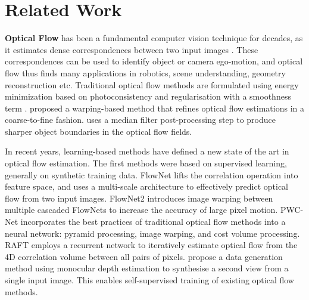 \section{Related Work}

\textbf{Optical Flow}
has been a fundamental computer vision technique for decades, as it estimates dense correspondences between two input images \cite{BakerSLRBS2011,MenzeHG2018}.
These correspondences can be used to identify object or camera ego-motion, and optical flow thus finds many applications in robotics, scene understanding, geometry reconstruction etc.
%
Traditional optical flow methods are formulated using energy minimization based on photoconsistency and regularisation with a smoothness term \cite{KroegTDV2016, HornS1981, LucasK1981, BlackA1991}.
%
\citet{BroxBPW2004} proposed a warping-based method that refines optical flow estimations in a coarse-to-fine fashion.
%
\citet{SunRB2014} uses a median filter post-processing step to produce sharper object boundaries in the optical flow fields.


In recent years, learning-based methods have defined a new state of the art in optical flow estimation.
%
%
The first methods were based on supervised learning, generally on synthetic training data.
%
FlowNet \cite{DosovFIHHGSCB2015} lifts the correlation operation into feature space, and uses a multi-scale architecture to effectively predict optical flow from two input images.
%
FlowNet2 \cite{IlgMSKDB2017} introduces image warping between multiple cascaded FlowNets to increase the accuracy of large pixel motion.
%
PWC-Net \cite{SunYLK2020} incorporates the best practices of traditional optical flow methods into a neural network: pyramid processing, image warping, and cost volume processing.
%
RAFT \cite{TeedD2020a} employs a recurrent network to iteratively estimate optical flow from the 4D correlation volume between all pairs of pixels. %
%
\citet{AleotPM2021} propose a data generation method using monocular depth estimation to synthesise a second view from a single input image.
This enables self-supervised training of existing optical flow methods.


